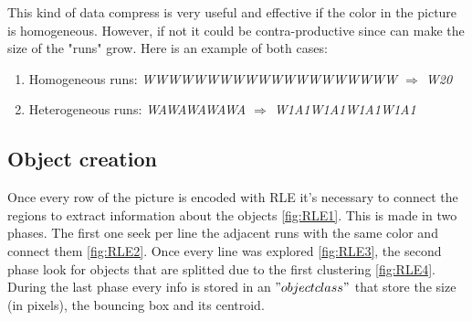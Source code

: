 This kind of data compress is very useful and effective if the color in the picture is homogeneous. However, if not it could be contra-productive since can make the size of the "runs" grow. Here is an example of both cases: \\

\begin{enumerate}
	\item Homogeneous runs: \textit{WWWWWWWWWWWWWWWWWWWW $\Rightarrow$ W20} \\
	\item Heterogeneous runs: \textit{WAWAWAWAWA $\Rightarrow$ W1A1W1A1W1A1W1A1} \\
\end{enumerate}

\subsection{Object creation}

Once every row of the picture is encoded with RLE it's necessary to connect the regions to extract information about the objects \ref{fig:RLE1}. This is made in two phases. The first one seek per line the adjacent runs with the same color and connect them \ref{fig:RLE2}. Once every line was explored \ref{fig:RLE3}, the second phase look for objects that are splitted due to the first clustering \ref{fig:RLE4}. During the last phase every info is stored in an $"object class"$ that store the size (in pixels), the bouncing box and its centroid.

